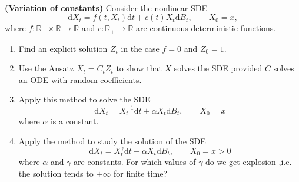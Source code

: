 \documentclass{article}
\newcommand{\mathd}{\mathrm{d}}
\newcommand{\tmtextbf}[1]{{\bfseries{#1}}}
\newenvironment{enumeratealpha}{\begin{enumerate}[a{\textup{)}}] }{\end{enumerate}}
\begin{document}
\

\hrulefill

\begin{exercise}
  [Pts 2+2+2+2] \tmtextbf{(Variation of constants)} Consider the nonlinear SDE
  \[ \mathd X_t = f (t, X_t) \mathd t + c (t) X_t \mathd B_t, \qquad X_0 = x,
  \]
  where $f : \mathbb{R}_+ \times \mathbb{R} \rightarrow \mathbb{R}$ and $c :
  \mathbb{R}_+ \rightarrow \mathbb{R}$ are continuous deterministic functions.
  \begin{enumeratealpha}
    \item Find an explicit solution $Z_t$ in the case $f = 0$ and $Z_0 = 1$.
    
    \item Use the Ansatz $X_t = C_t Z_t$ to show that $X$ solves the SDE
    provided $C$ solves an ODE with random coefficients.
    
    \item Apply this method to solve the SDE
    \[ \mathd X_t = X_t^{- 1} \mathd t + \alpha X_t \mathd B_t, \qquad X_0 =
       x \]
    where $\alpha$ is a constant.
    
    \item Apply the method to study the solution of the SDE
    \[ \mathd X_t = X_t^{\gamma} \mathd t + \alpha X_t \mathd B_t, \qquad X_0
       = x > 0 \]
    where $\alpha$ and $\gamma$ are constants. For which values of $\gamma$ do
    we get explosion ,i.e. the solution tends to $+ \infty$ for finite time?
  \end{enumeratealpha}
\end{exercise}

\hrulefill

\
\end{document}
